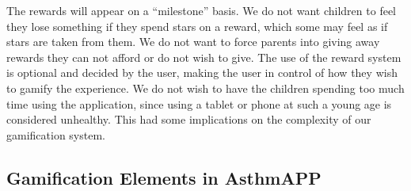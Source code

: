 The rewards will appear on a ``milestone'' basis. We do not want children to feel they lose something if they spend stars on a reward, which some may feel as if stars are taken from them. We do not want to force parents into giving away rewards they can not afford or do not wish to give. The use of the reward system is optional and decided by the user, making the user in control of how they wish to gamify the experience. 
We do not wish to have the children spending too much time using the application, since using a tablet or phone at such a young age is considered unhealthy. This had some implications on the complexity of our gamification system. 


\subsection{Gamification Elements in AsthmAPP}
\label{sec:combininggamemechanismsinasthmapp}

